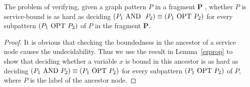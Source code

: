 \begin{corollary}
	The problem of verifying, given a graph pattern $P$ in a fragment
	$\mathbf{P}$ , whether $P$ is
	service-bound is as hard as deciding $(P_1 \mbox{ AND } \ P_2) \equiv (P_1 \mbox{ OPT }
	P_2)$ for every subpattern $(P_1 \mbox{ OPT } P_2)$ of $P$ in the fragment
	$\mathbf{P}$.
\end{corollary}

\begin{proof}
	It is obvious that checking the boundedness in the ancestor of a service
	node causes the undecidability. Thus we use the result in Lemma~\ref{ezprop} to
	show that deciding whether a variable $x$ is bound in this ancestor is as
	hard as deciding $(P_1 \mbox{ AND } P_2)
	\equiv (P_1 \mbox{ OPT }  P_2)$ for every subpattern $(P_1 \mbox{ OPT } P_2)$ of $P$, where
	$P$ is the label of the ancestor node.
\end{proof}


